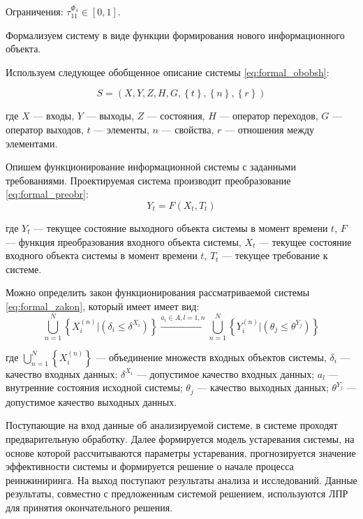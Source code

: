 Ограничения: $\tau^{\Phi_4}_{11} \in [0,1]$.

Формализуем систему в виде функции формирования нового информационного объекта.

Используем следующее обобщенное описание системы \ref{eq:formal_obobsh}: 

\begin{equation}
    \label{eq:formal_obobsh}
    S=(X,Y,Z,H,G, \left\{ t \right\}, \left\{ n \right\}, \left\{ r \right\} )
\end{equation}
\vspace{0.5em}

\noindent
где $X$ --- входы,
$Y$ --- выходы,
$Z$ --- состояния,
$H$ --- оператор переходов,
$G$ --- оператор выходов,
$t$ --- элементы,
$n$ --- свойства,
$r$ --- отношения между элементами.

Опишем функционирование информационной системы с заданными требованиями. 
Проектируемая система производит преобразование \ref{eq:formal_preobr}:
\begin{equation}
    \label{eq:formal_preobr}
    Y_t=F(X_t,T_t)
\end{equation} 
\vspace{0.5em}

\noindent
где $Y_t$ --- текущее состояние выходного объекта системы в момент времени $t$,
$F$ --- функция преобразования входного объекта системы,
$X_t$ --- текущее состояние входного объекта системы в момент времени $t$,
$T_t$ --- текущее требование к системе.

Можно определить закон функционирования рассматриваемой системы \ref{eq:formal_zakon}, который имеет имеет вид: 
\begin{equation}
    \label{eq:formal_zakon}
    \bigcup_{n=1}^N \left\{ X_i^{(n)} | (\delta_i \leq \delta^{X_i}) \right\}
    \xrightarrow{a_i \in A, l=\overline{1,n}}
    \bigcup_{n=1}^N \left\{ Y_i^{(n)} | (\theta_j \leq \theta^{Y_j}) \right\}
\end{equation} 
\vspace{0.5em}

\noindent
где $\bigcup_{n=1}^N \left\{ X_i^{(n)} \right\}$ --- объединение множеств входных объектов системы,
$\delta_i$ --- качество входных данных;
$\delta^{X_i}$ --- допустимое качество входных данных; 
$a_l$ --- внутренние состояния исходной системы; 
$\theta_j$ --- качество выходных данных;
$\theta^{Y_j}$ --- допустимое качество выходных данных. 

Поступающие на вход данные об анализируемой системе, в системе проходят предварительную обработку. 
Далее формируется модель устаревания системы, на основе которой рассчитываются параметры устаревания, прогнозируется значение эффективности системы и формируется решение о начале процесса реинжиниринга. 
На выход поступают результаты анализа и исследований. 
Данные результаты, совместно с предложенным системой решением, используются ЛПР для принятия окончательного решения.

